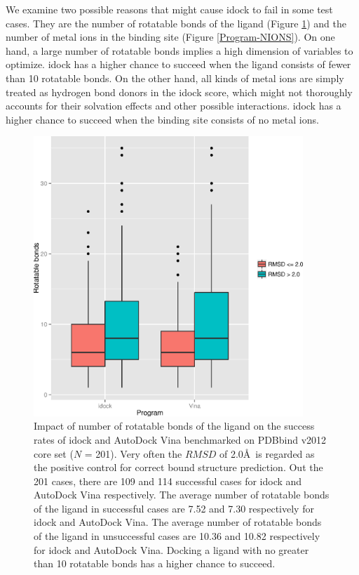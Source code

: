 We examine two possible reasons that might cause idock to fail in some test cases. They are the number of rotatable bonds of the ligand (Figure \ref{Program-NRB}) and the number of metal ions in the binding site (Figure \ref{Program-NIONS}). On one hand, a large number of rotatable bonds implies a high dimension of variables to optimize. idock has a higher chance to succeed when the ligand consists of fewer than 10 rotatable bonds. On the other hand, all kinds of metal ions are simply treated as hydrogen bond donors in the idock score, which might not thoroughly accounts for their solvation effects and other possible interactions. idock has a higher chance to succeed when the binding site consists of no metal ions.

\begin{figure}[!ht]
\begin{center}
\includegraphics[width=4in]{../istar/Program-NRB.eps}
\end{center}
\caption{Impact of number of rotatable bonds of the ligand on the success rates of idock and AutoDock Vina benchmarked on PDBbind v2012 core set ($N$ = 201). Very often the $RMSD$ of 2.0\AA\ is regarded as the positive control for correct bound structure prediction. Out the 201 cases, there are 109 and 114 successful cases for idock and AutoDock Vina respectively. The average number of rotatable bonds of the ligand in successful cases are 7.52 and 7.30 respectively for idock and AutoDock Vina. The average number of rotatable bonds of the ligand in unsuccessful cases are 10.36 and 10.82 respectively for idock and AutoDock Vina. Docking a ligand with no greater than 10 rotatable bonds has a higher chance to succeed.}
\label{Program-NRB}
\end{figure}

